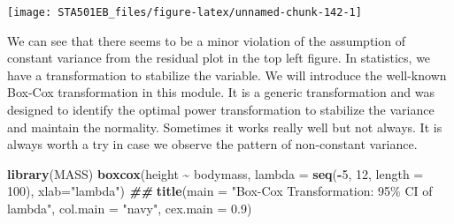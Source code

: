 \documentclass[
]{book}
\newenvironment{Shaded}{\begin{snugshade}}{\end{snugshade}}
\newcommand{\AttributeTok}[1]{\textcolor[rgb]{0.13,0.29,0.53}{#1}}
\newcommand{\CommentTok}[1]{\textcolor[rgb]{0.56,0.35,0.01}{\textit{#1}}}
\newcommand{\DecValTok}[1]{\textcolor[rgb]{0.00,0.00,0.81}{#1}}
\newcommand{\DocumentationTok}[1]{\textcolor[rgb]{0.56,0.35,0.01}{\textbf{\textit{#1}}}}
\newcommand{\FloatTok}[1]{\textcolor[rgb]{0.00,0.00,0.81}{#1}}
\newcommand{\FunctionTok}[1]{\textcolor[rgb]{0.13,0.29,0.53}{\textbf{#1}}}
\newcommand{\NormalTok}[1]{#1}
\newcommand{\SpecialCharTok}[1]{\textcolor[rgb]{0.81,0.36,0.00}{\textbf{#1}}}
\newcommand{\StringTok}[1]{\textcolor[rgb]{0.31,0.60,0.02}{#1}}
\begin{document}
\begin{Shaded}
\end{Shaded}

\begin{center}\texttt{[image: STA501EB\_files/figure-latex/unnamed-chunk-142-1]} \end{center}

We can see that there seems to be a minor violation of the assumption of constant variance from the residual plot in the top left figure. In statistics, we have a transformation to stabilize the variable. We will introduce the well-known Box-Cox transformation in this module. It is a generic transformation and was designed to identify the optimal power transformation to stabilize the variance and maintain the normality. Sometimes it works really well but not always. It is always worth a try in case we observe the pattern of non-constant variance.

\begin{Shaded}
\begin{Highlighting}[]
\FunctionTok{library}\NormalTok{(MASS)}
\FunctionTok{boxcox}\NormalTok{(height }\SpecialCharTok{\textasciitilde{}}\NormalTok{ bodymass, }
       \AttributeTok{lambda =} \FunctionTok{seq}\NormalTok{(}\SpecialCharTok{{-}}\DecValTok{5}\NormalTok{, }\DecValTok{12}\NormalTok{, }\AttributeTok{length =} \DecValTok{100}\NormalTok{), }
       \AttributeTok{xlab=}\StringTok{"lambda"}\NormalTok{)}
\DocumentationTok{\#\# }
\FunctionTok{title}\NormalTok{(}\AttributeTok{main =} \StringTok{"Box{-}Cox Transformation: 95\% CI of lambda"}\NormalTok{,}
      \AttributeTok{col.main =} \StringTok{"navy"}\NormalTok{, }\AttributeTok{cex.main =} \FloatTok{0.9}\NormalTok{)}
\end{Highlighting}
\end{Shaded}
\end{document}
